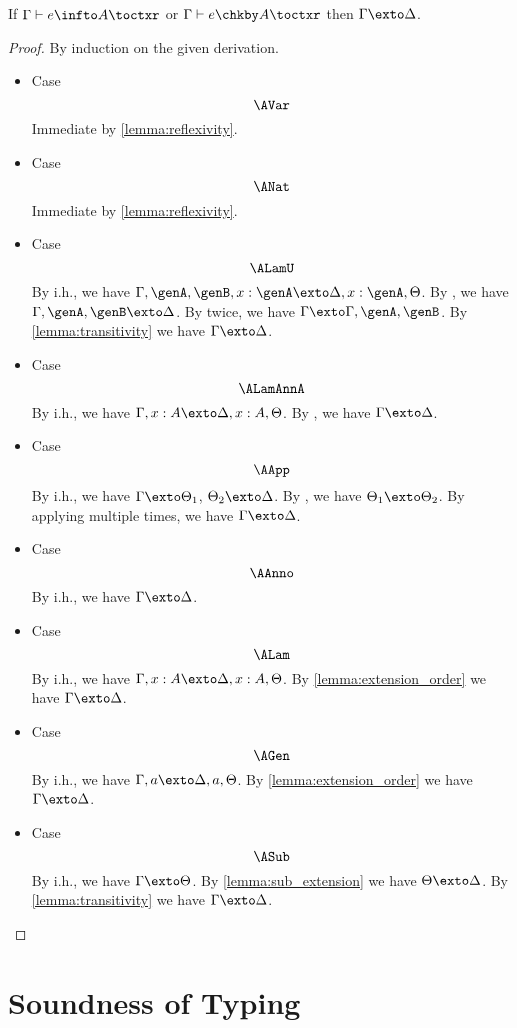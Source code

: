 \begin{mlemma}
  If $\Gamma \vdash e \infto A \toctxr$ or $\Gamma \vdash e \chkby A \toctxr$ then $\Gamma \exto \Delta$.
  \label{lemma:typing_extension}
\end{mlemma}
\begin{proof}
  By induction on the given derivation.
  \begin{itemize}
  \item Case \[ \AVar \] Immediate by \cref{lemma:reflexivity}.
  \item Case \[\ANat \] Immediate by \cref{lemma:reflexivity}.
  \item Case \[\ALamU \] By i.h., we have $\Gamma, \genA, \genB, x : \genA \exto
    \Delta, x : \genA, \Theta$. By , we have
    $\Gamma, \genA, \genB \exto \Delta$. By  twice, we have $\Gamma
    \exto \Gamma, \genA, \genB$. By \cref{lemma:transitivity} we have $\Gamma
    \exto \Delta$.
  \item Case \[ \ALamAnnA \] By i.h., we have $\Gamma, x : A \exto \Delta, x :
    A, \Theta$. By , we have $\Gamma \exto \Delta$.
  \item Case \[ \AApp\] By i.h., we have $\Gamma \exto \Theta_1$, $\Theta_2
    \exto \Delta$. By , we have $\Theta_1 \exto
    \Theta_2$. By applying  multiple times, we have
    $\Gamma \exto \Delta$.
  \item Case \[\AAnno \] By i.h., we have $\Gamma \exto \Delta$.
  \item Case \[\ALam \] By i.h., we have $\Gamma, x : A \exto \Delta, x : A,
    \Theta$. By \cref{lemma:extension_order} we have $\Gamma \exto \Delta$.
  \item Case \[\AGen \] By i.h., we have $\Gamma, a \exto \Delta, a, \Theta$. By
    \cref{lemma:extension_order} we have $\Gamma \exto \Delta$.
  \item Case \[\ASub \] By i.h., we have $\Gamma \exto \Theta$. By
    \cref{lemma:sub_extension} we have $\Theta \exto \Delta$. By
    \cref{lemma:transitivity} we have $\Gamma \exto \Delta$.
  \end{itemize}
\end{proof}


\section{Soundness of Typing}
\label{sec:pf:sound:sub}

